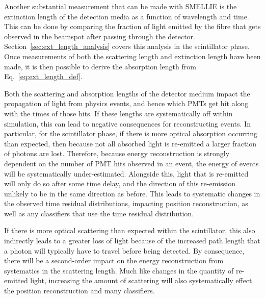 Another substantial measurement that can be made with SMELLIE is the extinction length of the detection media as a function of wavelength and time. This can be done by comparing the fraction of light emitted by the fibre that gets observed in the beamspot after passing through the detector. Section~\ref{sec:ext_length_analysis} covers this analysis in the scintillator phase. Once measurements of both the scattering length and extinction length have been made, it is then possible to derive the absorption length from Eq.~\ref{eq:ext_length_def}.

Both the scattering and absorption lengths of the detector medium impact the propagation of light from physics events, and hence which PMTs get hit along with the times of those hits. If these lengths are systematically off within simulation, this can lead to negative consequences for reconstructing events. In particular, for the scintillator phase, if there is more optical absorption occurring than expected, then because not all absorbed light is re-emitted a larger fraction of photons are lost. Therefore, because energy reconstruction is strongly dependent on the number of PMT hits observed in an event, the energy of events will be systematically under-estimated. Alongside this, light that is re-emitted will only do so after some time delay, and the direction of this re-emission unlikely to be in the same direction as before. This leads to systematic changes in the observed time residual distributions, impacting position reconstruction, as well as any classifiers that use the time residual distribution.

If there is more optical scattering than expected within the scintillator, this also indirectly leads to a greater loss of light because of the increased path length that a photon will typically have to travel before being detected. By consequence, there will be a second-order impact on the energy reconstruction from systematics in the scattering length. Much like changes in the quantity of re-emitted light, increasing the amount of scattering will also systematically effect the position reconstruction and many classifiers.


